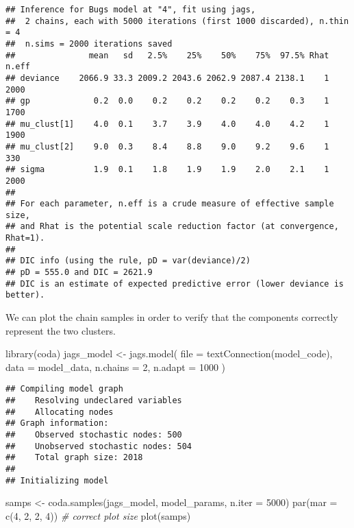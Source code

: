 \documentclass[
  oneside]{book}
\newenvironment{Shaded}{\begin{snugshade}}{\end{snugshade}}
\newcommand{\AttributeTok}[1]{\textcolor[rgb]{0.77,0.63,0.00}{#1}}
\newcommand{\CommentTok}[1]{\textcolor[rgb]{0.56,0.35,0.01}{\textit{#1}}}
\newcommand{\DecValTok}[1]{\textcolor[rgb]{0.00,0.00,0.81}{#1}}
\newcommand{\FunctionTok}[1]{\textcolor[rgb]{0.00,0.00,0.00}{#1}}
\newcommand{\NormalTok}[1]{#1}
\newcommand{\OtherTok}[1]{\textcolor[rgb]{0.56,0.35,0.01}{#1}}
\newcommand{\SpecialCharTok}[1]{\textcolor[rgb]{0.00,0.00,0.00}{#1}}
\begin{document}
\begin{Shaded}
\end{Shaded}

\begin{verbatim}
## Inference for Bugs model at "4", fit using jags,
##  2 chains, each with 5000 iterations (first 1000 discarded), n.thin = 4
##  n.sims = 2000 iterations saved
##               mean   sd   2.5%    25%    50%    75%  97.5% Rhat n.eff
## deviance    2066.9 33.3 2009.2 2043.6 2062.9 2087.4 2138.1    1  2000
## gp             0.2  0.0    0.2    0.2    0.2    0.2    0.3    1  1700
## mu_clust[1]    4.0  0.1    3.7    3.9    4.0    4.0    4.2    1  1900
## mu_clust[2]    9.0  0.3    8.4    8.8    9.0    9.2    9.6    1   330
## sigma          1.9  0.1    1.8    1.9    1.9    2.0    2.1    1  2000
## 
## For each parameter, n.eff is a crude measure of effective sample size,
## and Rhat is the potential scale reduction factor (at convergence, Rhat=1).
## 
## DIC info (using the rule, pD = var(deviance)/2)
## pD = 555.0 and DIC = 2621.9
## DIC is an estimate of expected predictive error (lower deviance is better).
\end{verbatim}

We can plot the chain samples in order to verify that the
components correctly represent the two clusters.

\begin{Shaded}
\begin{Highlighting}[]
\FunctionTok{library}\NormalTok{(coda)}
\NormalTok{jags\_model }\OtherTok{\textless{}{-}} \FunctionTok{jags.model}\NormalTok{(}
  \AttributeTok{file =} \FunctionTok{textConnection}\NormalTok{(model\_code),}
  \AttributeTok{data =}\NormalTok{ model\_data,}
  \AttributeTok{n.chains =} \DecValTok{2}\NormalTok{,}
  \AttributeTok{n.adapt =} \DecValTok{1000}
\NormalTok{)}
\end{Highlighting}
\end{Shaded}

\begin{verbatim}
## Compiling model graph
##    Resolving undeclared variables
##    Allocating nodes
## Graph information:
##    Observed stochastic nodes: 500
##    Unobserved stochastic nodes: 504
##    Total graph size: 2018
## 
## Initializing model
\end{verbatim}

\begin{Shaded}
\begin{Highlighting}[]
\NormalTok{samps }\OtherTok{\textless{}{-}} \FunctionTok{coda.samples}\NormalTok{(jags\_model, model\_params, }\AttributeTok{n.iter =} \DecValTok{5000}\NormalTok{)}
\FunctionTok{par}\NormalTok{(}\AttributeTok{mar =} \FunctionTok{c}\NormalTok{(}\DecValTok{4}\NormalTok{, }\DecValTok{2}\NormalTok{, }\DecValTok{2}\NormalTok{, }\DecValTok{4}\NormalTok{)) }\CommentTok{\# correct plot size}
\FunctionTok{plot}\NormalTok{(samps)}
\end{Highlighting}
\end{Shaded}
\end{document}
